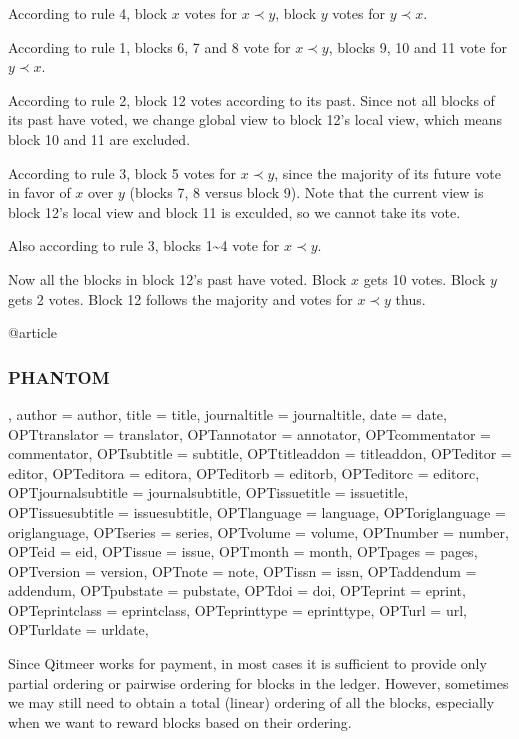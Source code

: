 \documentclass[a4paper,11pt]{article}
\begin{document}
According to rule 4, block $x$ votes for $x \prec y$, block $y$ votes for $y
\prec x$.

According to rule 1, blocks 6, 7 and 8 vote for $x \prec y$, blocks 9, 10 and 11
vote for $y \prec x$.

According to rule 2, block 12 votes according to its past. Since not all blocks
of its past have voted, we change global view to block 12's local view, which
means block 10 and 11 are excluded.

According to rule 3, block 5 votes for $x \prec y$, since the majority of its
future vote in favor of $x$ over $y$ (blocks 7, 8 versus block 9). Note that the
current view is block 12's local view and block 11 is exculded, so we cannot
take its vote.

Also according to rule 3, blocks 1\textasciitilde4 vote for $x \prec y$.

Now all the blocks in block 12's past have voted. Block $x$ gets 10 votes. Block
$y$ gets 2 votes. Block 12 follows the majority and votes for $x \prec y$ thus.

@article{\subsubsection{PHANTOM},
	author = {author},
	title = {title},
	journaltitle = {journaltitle},
	date = {date},
	OPTtranslator = {translator},
	OPTannotator = {annotator},
	OPTcommentator = {commentator},
	OPTsubtitle = {subtitle},
	OPTtitleaddon = {titleaddon},
	OPTeditor = {editor},
	OPTeditora = {editora},
	OPTeditorb = {editorb},
	OPTeditorc = {editorc},
	OPTjournalsubtitle = {journalsubtitle},
	OPTissuetitle = {issuetitle},
	OPTissuesubtitle = {issuesubtitle},
	OPTlanguage = {language},
	OPToriglanguage = {origlanguage},
	OPTseries = {series},
	OPTvolume = {volume},
	OPTnumber = {number},
	OPTeid = {eid},
	OPTissue = {issue},
	OPTmonth = {month},
	OPTpages = {pages},
	OPTversion = {version},
	OPTnote = {note},
	OPTissn = {issn},
	OPTaddendum = {addendum},
	OPTpubstate = {pubstate},
	OPTdoi = {doi},
	OPTeprint = {eprint},
	OPTeprintclass = {eprintclass},
	OPTeprinttype = {eprinttype},
	OPTurl = {url},
	OPTurldate = {urldate},
}


Since Qitmeer works for payment, in most cases it is
sufficient to provide only partial ordering or pairwise ordering for blocks in
the ledger. However, sometimes we may still need to obtain a total (linear)
ordering of all the blocks, especially when we want to reward blocks based on
their ordering. 
\end{document}
